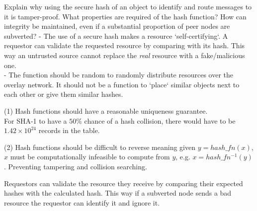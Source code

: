 \documentclass{article}
\begin{document}
\begin{tcolorbox}[colback=blue!5!white,colframe=blue!75!black,title=Question 4 (10.7)]
    Explain why using the secure hash of an object to identify and route messages to it is
    tamper-proof. What properties are required of the hash function? How can integrity be
    maintained, even if a substantial proportion of peer nodes are subverted?
    \tcblower
    - The use of a secure hash makes a resource `self-certifying`. A requestor can validate the requested resource by comparing with its hash.
    This way an untrusted source cannot replace the \textit{real} resource with a fake/malicious one.\\
    - The function should be random to randomly distribute resources over the overlay network. It should not
    be a function to `place` similar objects next to each other or give them similar hashes.
    
    \begin{enumerate}(1)
        Hash functions should have a reasonable uniqueness guarantee.\\ For SHA-1 to have a $50\%$ chance
        of a hash collision, there would have to be $1.42 \times 10^{24}$ records in the table. \citet{LINSTEDT201617} 
    \end{enumerate}
    \begin{enumerate}(2)
        Hash functions should be difficult to reverse meaning given $y = hash\_fn(x)$, $x$ must be computationally
        infeasible to compute from $y$, e.g. $x = hash\_fn^{-1}(y)$. Preventing tampering and collision searching.
    \end{enumerate}
    
    Requestors can validate the resource they receive by comparing their expected hashes with the calculated hash. This way if a subverted
    node sends a bad resource the requestor can identify it and ignore it.
\end{tcolorbox}
\end{document}
